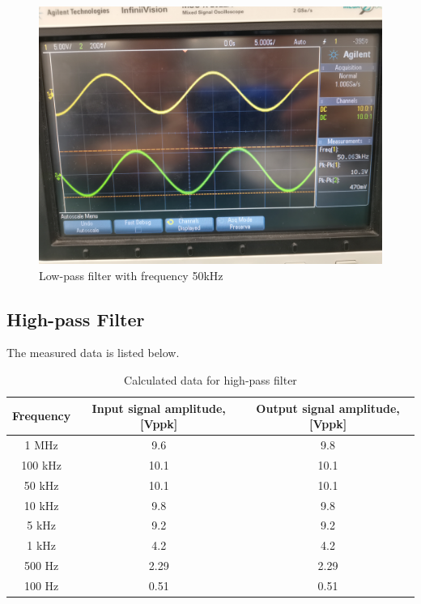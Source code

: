 \documentclass{article}
\begin{document}
  \begin{figure}[H]
  \centering
  \includegraphics[width=.6\textwidth]{Figure8.jpg}
  \caption{Low-pass filter with frequency 50kHz}
  \label{img} 
\end{figure}


\subsection{High-pass Filter}
The measured data is listed below.
\begin{table}[H]
\centering
\begin{tabular}{|c|c|c|}
\hline
Frequency & Input signal amplitude, {[}Vppk{]} & Output signal amplitude, {[}Vppk{]} \\ \hline
1 MHz     & 9.6                                & 9.8                                 \\ \hline
100 kHz   & 10.1                               & 10.1                                \\ \hline
50 kHz    & 10.1                               & 10.1                                \\ \hline
10 kHz    & 9.8                                & 9.8                                 \\ \hline
5 kHz     & 9.2                                & 9.2                                 \\ \hline
1 kHz     & 4.2                                & 4.2                                 \\ \hline
500 Hz    & 2.29                               & 2.29                                \\ \hline
100 Hz    & 0.51                               & 0.51                                \\ \hline
\end{tabular}
\caption{Calculated data for high-pass filter}
\end{table}
\end{document}
